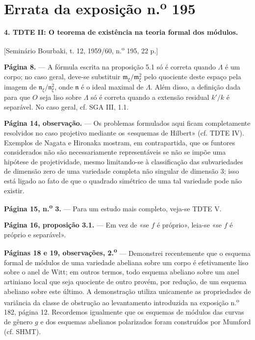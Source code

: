 \clearpage
\chapter*{Errata da exposição n.\textsuperscript{o} 195}
\setcounter{footnote}{0}

\noindent\textbf{4. TDTE II: O teorema de existência na teoria formal dos
módulos.}

\begin{center}
[Seminário Bourbaki, t. 12, 1959/60, n.\textsuperscript{o} 195, 22 p.]
\end{center}

\noindent\textbf{Página 8.} --- A fórmula escrita na proposição 5.1 só é
correta quando $\Lambda$ é um corpo; no caso geral, deve-se substituir
$\mathfrak m_\xi/\mathfrak m_\xi^2$ pelo quociente deste espaço pela
imagem de $\mathfrak n_\xi/\mathfrak n_\xi^2$, onde $\mathfrak n$ é o ideal
maximal de $\Lambda$. Além disso, a definição dada para que $O$ seja liso sobre
$\Lambda$ só é correta quando a extensão residual $k'/k$ é separável.
No caso geral, cf. SGA III, 1.1.

\noindent\textbf{Página 14, observação.} --- Os problemas formulados aqui
ficam completamente resolvidos no caso projetivo mediante os «esquemas de
Hilbert» (cf. TDTE IV). Exemplos de Nagata e Hironaka mostram, em contrapartida, que
os funtores considerados não são necessariamente representáveis se não se impõe
uma hipótese de projetividade, mesmo limitando-se à classificação das
subvariedades de dimensão zero de uma variedade completa não singular de
dimensão 3; isso está ligado ao fato de que o quadrado simétrico de uma
tal variedade pode não existir.

\noindent\textbf{Página 15, n.\textsuperscript{o} 3.} --- Para um estudo mais
completo, veja-se TDTE V.

\noindent\textbf{Página 16, proposição 3.1.} --- Em vez de «se $f$ é
próprio», leia-se «se $f$ é próprio e separável».

\noindent\textbf{Páginas 18 e 19, observações, 2.\textsuperscript{o}} --- Demonstrei
recentemente que o esquema formal de módulos de uma variedade
abeliana sobre um corpo é efetivamente liso sobre o anel de Witt; em
outros termos, todo esquema abeliano sobre um anel artiniano local que seja
quociente de outro provém, por redução, de um esquema abeliano sobre este
último. A demonstração utiliza unicamente as propriedades de variância da
classe de obstrução ao levantamento introduzida na exposição
n.\textsuperscript{o} 182, página 12. Recordemos igualmente que os esquemas de
módulos das curvas de gênero $g$ e dos esquemas abelianos polarizados foram
construídos por Mumford (cf. SHMT).

